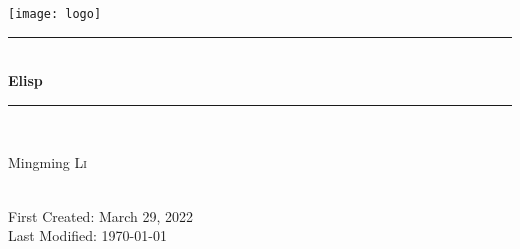 \newcommand{\mytitle}{Elisp}
\newcommand{\firstcreated}{March 29, 2022}

\begin{titlepage}

\newcommand{\HRule}{\rule{\linewidth}{0.5mm}} %

\center                         %
 

\texttt{[image: logo]}\\[1cm] %


\HRule\\[0.4cm]
{ \huge \bfseries \mytitle}\\[0.4cm] %
\HRule\\[1.5cm]
 

\begin{minipage}{0.4\textwidth}
\begin{center} \large
Mingming \textsc{Li}\\ %
\end{center}

\end{minipage}\\[2cm]


\vfill
{\large First Created: \firstcreated}\\
{\large Last Modified: \today}\\[2cm] %



\end{titlepage}


